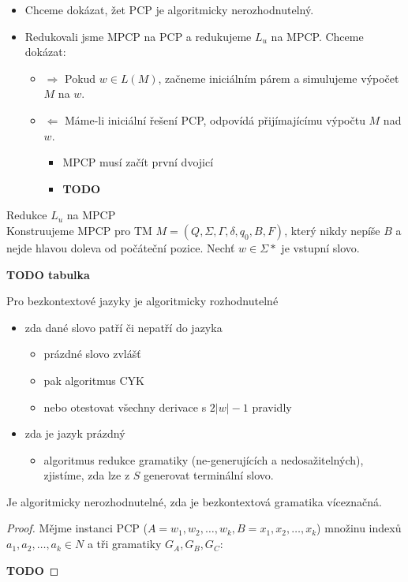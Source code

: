 \documentclass[../main.tex]{subfiles}
\begin{document}
\begin{itemize}
    \item Chceme dokázat, žet PCP je algoritmicky nerozhodnutelný.
    \item Redukovali jsme MPCP na PCP a redukujeme $L_u$ na MPCP. Chceme dokázat:
    \begin{itemize}
        \item $\Rightarrow$ Pokud $w\in L(M)$, začneme iniciálním párem a simulujeme výpočet $M$ na $w$.
        \item $\Leftarrow$ Máme-li iniciální řešení PCP, odpovídá přijímajícímu výpočtu $M$ nad $w$.
        \begin{itemize}
            \item MPCP musí začít první dvojicí
            \item \textbf{TODO}
        \end{itemize}
    \end{itemize}
\end{itemize}
\begin{algorithm}
    Redukce $L_u$ na MPCP\\

    Konstruujeme MPCP pro TM $M = (Q,\Sigma,\Gamma, \delta, q_0, B,F)$, který nikdy nepíše $B$ a nejde hlavou doleva od počáteční pozice. Nechť $w\in \Sigma*$ je vstupní slovo.
    
    \textbf{TODO tabulka}
\end{algorithm}
Pro bezkontextové jazyky je algoritmicky rozhodnutelné
\begin{itemize}
    \item zda dané slovo patří či nepatří do jazyka
    \begin{itemize}
        \item prázdné slovo zvlášť
        \item pak algoritmus CYK
        \item nebo otestovat všechny derivace s $2|w| - 1$ pravidly
    \end{itemize}
    \item zda je jazyk prázdný
    \begin{itemize}
        \item algoritmus redukce gramatiky (ne-generujících a nedosažitelných), zjistíme, zda lze z $S$ generovat terminální slovo.
    \end{itemize}
\end{itemize}
\begin{theorem}
    Je algoritmicky nerozhodnutelné, zda je bezkontextová gramatika víceznačná.
    \begin{proof}
        Mějme instanci PCP ($A = w_1,w_2,\dots,w_k, B = x_1,x_2,\dots,x_k$) množinu indexů $a_1,a_2,\dots,a_k \in N$ a tři gramatiky $G_A,G_B,G_C$:
        
        \textbf{TODO}
    \end{proof}
\end{theorem}
\end{document}
